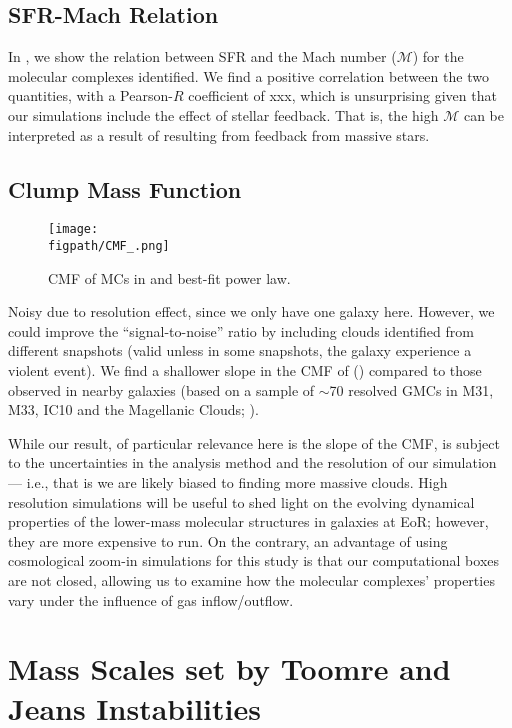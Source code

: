 \documentclass[apj]{emulateapj} %
\begin{document}
\subsection{SFR-Mach Relation}
In \Fig{}, we show the relation between SFR and the Mach number ($\mathcal{M}$) for the molecular 
complexes identified. 
We find a positive correlation between the two quantities, with a Pearson-$R$ coefficient of xxx, 
which is unsurprising given that our simulations include the effect of stellar feedback. That is, 
the high $\mathcal{M}$ can be interpreted as a result of \SF resulting from feedback from 
massive stars.


\subsection{Clump Mass Function}

\begin{figure*}[htbp]
\centering
\texttt{[image: \\figpath/CMF\_.png]}  
\caption{
CMF of MCs in \flower and best-fit power law.
\label{fig:cmf}}
\end{figure*}

Noisy due to resolution effect, since we only have one galaxy here. However, 
we could improve the ``signal-to-noise'' ratio by including clouds identified from different 
snapshots (valid unless in some snapshots, the galaxy experience a violent event).
We find a shallower slope in the CMF of \flower () 
compared to those observed in nearby galaxies (based on a sample of 
$\sim$70 resolved GMCs in M31, M33, IC10 and the Magellanic Clouds; \citealt{Blitz07a}).

While our result, of particular relevance here is the slope of the CMF, is subject 
to the uncertainties in the analysis method and the resolution of our simulation --- i.e., that is 
we are likely biased to finding more massive clouds.
High resolution simulations will be useful to shed light on 
the evolving dynamical properties of the lower-mass molecular structures in 
galaxies at EoR; however, they are more expensive to run.
On the contrary, an advantage of using cosmological zoom-in simulations for this study
is that our computational boxes are not closed, allowing us to examine how 
the molecular complexes' properties vary under the influence of gas inflow/outflow.


\section{Mass Scales set by Toomre and Jeans Instabilities}
\end{document}
